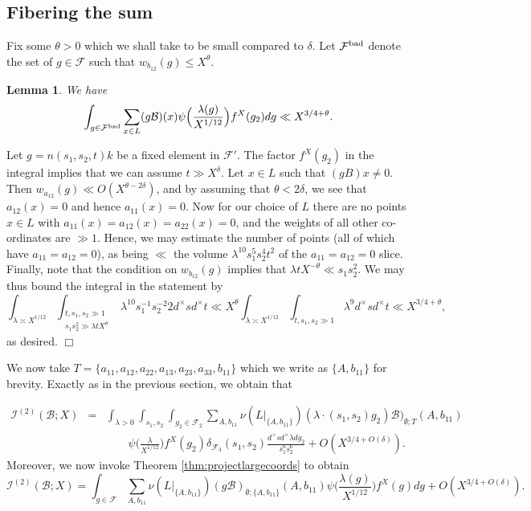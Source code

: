 \documentclass{article}
\def\bad{{\rm bad}}
\def\cB{{\mathcal B}}
\def\FF{{\mathcal F}}
\def\I{{\mathcal I}}
\newtheorem{lemma}[theorem]{Lemma}
\newenvironment{proof}{\noindent {\bf Proof:}}{$\Box$ \vspace{2 ex}}
\begin{document}
\subsection{Fibering the sum}

Fix some $\theta>0$ which we shall take to be small compared to $\delta$. Let $\FF^{\bad}$
denote the set of $g\in\FF$ such that $w_{b_{12}}(g)\leq X^{\theta}$.

\begin{lemma}\label{lem:t_big_regions}
We have
\begin{equation}
\int_{g\in\FF^\bad}\sum_{x\in L} (g\cB)(x)\psi\Big(\frac{\lambda(g)}{X^{1/12}}\Big)f^X(g_2)dg\ll X^{3/4+\theta}.
\end{equation}
\end{lemma}
\begin{proof}
Let $g=n(s_1,s_2,t)k$ be a fixed element in $\FF'$. The factor $f^X(g_2)$ in the integral implies that we can assume $t\gg X^\delta$. Let $x\in L$ such that $(gB)x\neq 0$.
Then $w_{a_{12}}(g)\ll O(X^{\theta-2\delta})$, and by assuming that $\theta<2\delta$, we see that $a_{12}(x)=0$ and hence $a_{11}(x)=0$. Now for our choice of $L$ there are no points $x\in L$ with $a_{11}(x)=a_{12}(x)=a_{22}(x)=0$, and the weights of all other co-ordinates are $\gg 1$. Hence, we may estimate the number of points (all of which have $a_{11}=a_{12}=0$), as being $\ll$ the volume $\lambda^{10}s_1^5s_2^4t^2$ of the $a_{11}=a_{12}=0$ slice. Finally, note that the condition on $w_{b_{12}}(g)$ implies that $\lambda t X^{-\theta}\ll s_1s_2^2$. We may thus bound the integral in the statement by
$$\int_{\lambda\asymp X^{1/12}}\int_{\substack{t,s_1,s_2\gg 1\\ s_1s_2^2\gg\lambda t X^{\theta}}} \lambda^{10}s_1^{-1}s_2^{-2}2d^{\times}sd^{\times}t \ll X^{\theta}\int_{\lambda\asymp X^{1/12}} \int_{t,s_1,s_2\gg 1} \lambda^9d^{\times}sd^{\times}t \ll X^{3/4+\theta}, $$ as desired.
\end{proof}

We now take $T=\{a_{11},a_{12},a_{22},a_{13},a_{23},a_{33},b_{11}\}$ which we write as $\{A,b_{11}\}$ for brevity. Exactly as in the previous section, we obtain that


\begin{equation*}
\begin{array}{rcl}
\displaystyle
\I^{(2)}(\cB;X)
&=&\displaystyle
\int_{\lambda>0}\int_{s_1,s_2}\int_{g_2\in\FF_2}\sum_{A,b_{11}}\nu(L|_{\{A,b_{11}\}})(\lambda\cdot (s_1,s_2)g_2)\cB)_{\emptyset;T}(A,b_{11})
\\[.2in]
&&\displaystyle\quad\quad \psi\Big(\frac{\lambda}{X^{1/12}}\Big)f^X(g_2)\delta_{\FF_3}(s_1,s_2)\frac{d^\times sd^\times\lambda dg_2}{s_1^6s_2^6} + O(X^{3/4 + O(\delta)}).
\end{array}
\end{equation*}
Moreover, we now invoke Theorem \ref{thm:projectlargecoords} to obtain
\begin{equation}\label{eq:cor_t_big_1}
\I^{(2)}(\cB;X)=\int_{g\in\FF}\sum_{A,b_{11}}\nu(L|_{\{A,b_{11}\}})(g\cB)_{\emptyset;\{A,b_{11}\}}(A,b_{11})
\psi\Big(\frac{\lambda(g)}{X^{1/12}}\Big)f^X(g)dg + O(X^{3/4 + O(\delta)}).
\end{equation}
\end{document}

